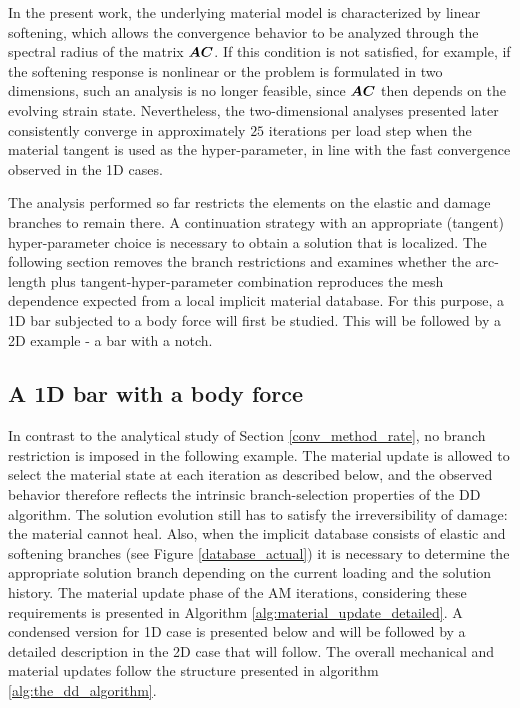 \documentclass[10pt]{cas-sc}
\newcommand{\added}[1]{#1}
\newenvironment{addedblock}{}{}
\begin{document}



In the present work, the underlying material model is characterized by linear softening, which allows the convergence behavior to be analyzed through the spectral radius of the matrix 
$ \mbox{\boldmath $A$} \mbox{\boldmath $C$}$. If this condition is not satisfied, for example, if the softening response is nonlinear or the problem is formulated in two dimensions, such an analysis is no longer feasible, since $ \mbox{\boldmath $A$} \mbox{\boldmath $C$}$ then depends on the evolving strain state. Nevertheless, the two-dimensional analyses presented later consistently converge in approximately $25$ iterations per load step when the material tangent is used as the hyper-parameter, in line with the fast convergence observed in the 1D cases.

\begin{addedblock}
The analysis performed so far restricts the elements on the elastic and damage branches to remain there. A continuation strategy with an appropriate (tangent) hyper-parameter choice is necessary to obtain a solution that is localized. The following section removes the branch restrictions and examines whether the arc-length plus tangent-hyper-parameter combination reproduces the mesh dependence expected from a local implicit material database. For this purpose, a 1D bar subjected to a body force will first be studied. This will be followed by a 2D example - a bar with a notch. 
\end{addedblock}


\subsection{A 1D bar with a body force\label{1d_bar_with_bf}}
In contrast to the analytical study of Section \ref{conv_method_rate}, no branch restriction is imposed in the following example. The material update is allowed to select the material state at each iteration as described below, and the observed behavior therefore reflects the intrinsic branch-selection properties of the DD algorithm. \added{The solution evolution still has to satisfy the irreversibility of damage: the material cannot heal. Also, when the implicit database consists of elastic and softening branches (see Figure \ref{database_actual}) it is necessary to determine the appropriate solution branch depending on the current loading and the solution history. The material update phase of the AM iterations, considering these requirements is presented in Algorithm \ref{alg:material_update_detailed}. A condensed version for 1D case is presented below and will be followed by a detailed description in the 2D case that will follow. The overall mechanical and material updates follow the structure presented in algorithm \ref{alg:the_dd_algorithm}.}
\end{document}
